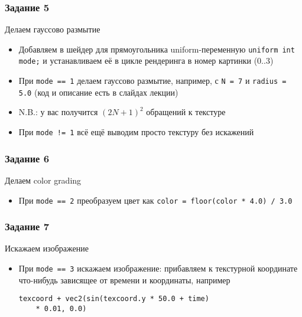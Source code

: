 \documentclass{beamer}
\begin{document}
\begin{frame}[fragile]
\frametitle{Задание 5}
Делаем гауссово размытие
\begin{itemize}
\item Добавляем в шейдер для прямоугольника uniform-переменную \verb|uniform int mode;| и устанавливаем её в цикле рендеринга в номер картинки (0..3)
\pause
\item При \verb|mode == 1| делаем гауссово размытие, например, с \verb|N = 7| и \verb|radius = 5.0| (код и описание есть в слайдах лекции)
\pause
\item N.B.: у вас получится \begin{math}(2N+1)^2\end{math} обращений к текстуре
\pause
\item При \verb|mode != 1| всё ещё выводим просто текстуру без искажений
\end{itemize}
\end{frame}

\begin{frame}[fragile]
\frametitle{Задание 6}
Делаем color grading
\begin{itemize}
\item При \verb|mode == 2| преобразуем цвет как \verb|color = floor(color * 4.0) / 3.0|
\end{itemize}
\end{frame}

\begin{frame}[fragile]
\frametitle{Задание 7}
Искажаем изображение
\begin{itemize}
\item При \verb|mode == 3| искажаем изображение: прибавляем к текстурной координате что-нибудь зависящее от времени и координаты, например 
\begin{verbatim}
texcoord + vec2(sin(texcoord.y * 50.0 + time)
    * 0.01, 0.0)
\end{verbatim}
\end{itemize}
\end{frame}
\end{document}
